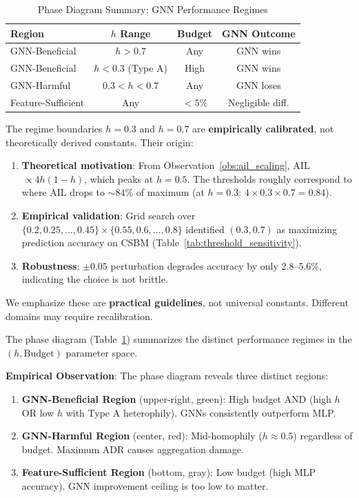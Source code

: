 \begin{table}[t]
\centering
\caption{Phase Diagram Summary: GNN Performance Regimes}
\label{tab:phase_diagram_summary}
\small
\begin{tabular}{@{}lccc@{}}
\toprule
\textbf{Region} & \textbf{$h$ Range} & \textbf{Budget} & \textbf{GNN Outcome} \\
\midrule
GNN-Beneficial & $h > 0.7$ & Any & GNN wins \\
GNN-Beneficial & $h < 0.3$ (Type A) & High & GNN wins \\
GNN-Harmful & $0.3 < h < 0.7$ & Any & GNN loses \\
Feature-Sufficient & Any & $< 5\%$ & Negligible diff. \\
\bottomrule
\end{tabular}
\end{table}

\begin{remark}[On Threshold Calibration: $h = 0.3$ and $h = 0.7$]
\label{rem:threshold_calibration}
The regime boundaries $h = 0.3$ and $h = 0.7$ are \textbf{empirically calibrated}, not theoretically derived constants. Their origin:
\begin{enumerate}
    \item \textbf{Theoretical motivation}: From Observation~\ref{obs:ail_scaling}, AIL $\propto 4h(1-h)$, which peaks at $h=0.5$. The thresholds roughly correspond to where AIL drops to $\sim 84\%$ of maximum (at $h=0.3$: $4 \times 0.3 \times 0.7 = 0.84$).
    \item \textbf{Empirical validation}: Grid search over $\{0.2, 0.25, ..., 0.45\} \times \{0.55, 0.6, ..., 0.8\}$ identified $(0.3, 0.7)$ as maximizing prediction accuracy on CSBM (Table~\ref{tab:threshold_sensitivity}).
    \item \textbf{Robustness}: $\pm 0.05$ perturbation degrades accuracy by only 2.8--5.6\%, indicating the choice is not brittle.
\end{enumerate}
We emphasize these are \textbf{practical guidelines}, not universal constants. Different domains may require recalibration.
\end{remark}

The phase diagram (Table~\ref{tab:phase_diagram_summary}) summarizes the distinct performance regimes in the $(h, \text{Budget})$ parameter space.

\textbf{Empirical Observation}: The phase diagram reveals three distinct regions:
\begin{enumerate}
    \item \textbf{GNN-Beneficial Region} (upper-right, green): High budget AND (high $h$ OR low $h$ with Type A heterophily). GNNs consistently outperform MLP.
    \item \textbf{GNN-Harmful Region} (center, red): Mid-homophily ($h \approx 0.5$) regardless of budget. Maximum ADR causes aggregation damage.
    \item \textbf{Feature-Sufficient Region} (bottom, gray): Low budget (high MLP accuracy). GNN improvement ceiling is too low to matter.
\end{enumerate}

